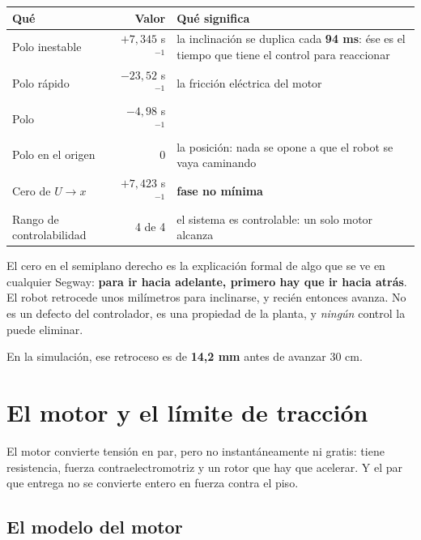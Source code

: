 \documentclass[11pt,a4paper]{report}
\begin{document}
\begin{center}
\begin{tabular}{@{}lr p{7.2cm}@{}}
\toprule
\textbf{Qué} & \textbf{Valor} & \textbf{Qué significa} \\
\midrule
Polo inestable & $+7{,}345$ s$^{-1}$ & la inclinación se duplica cada \textbf{94 ms}: ése
es el tiempo que tiene el control para reaccionar \\
Polo rápido & $-23{,}52$ s$^{-1}$ & la fricción eléctrica del motor \\
Polo & $-4{,}98$ s$^{-1}$ & \\
Polo en el origen & $0$ & la posición: nada se opone a que el robot se vaya caminando \\
Cero de $U \to x$ & $+7{,}423$ s$^{-1}$ & \textbf{fase no mínima} \\
Rango de controlabilidad & 4 de 4 & el sistema es controlable: un solo motor alcanza \\
\bottomrule
\end{tabular}
\end{center}

\begin{idea}
El cero en el semiplano derecho es la explicación formal de algo que se ve en cualquier
Segway: \textbf{para ir hacia adelante, primero hay que ir hacia atrás}. El robot retrocede
unos milímetros para inclinarse, y recién entonces avanza. No es un defecto del controlador,
es una propiedad de la planta, y \emph{ningún} control la puede eliminar.
\end{idea}

En la simulación, ese retroceso es de \textbf{14{,}2 mm} antes de avanzar 30 cm.

\chapter{El motor y el límite de tracción}\label{cap:motor}

\begin{idea}
El motor convierte tensión en par, pero no instantáneamente ni gratis: tiene resistencia,
fuerza contraelectromotriz y un rotor que hay que acelerar. Y el par que entrega no se
convierte entero en fuerza contra el piso.
\end{idea}

\section{El modelo del motor}
\end{document}

